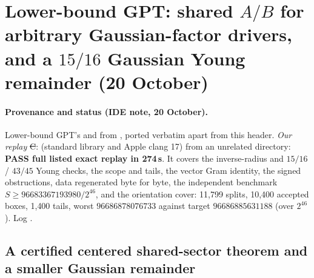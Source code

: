 \section{Lower-bound GPT: shared $A/B$ for arbitrary Gaussian-factor drivers, and a $15/16$ Gaussian Young remainder (20 October)}\label{ch:gaussian-remainder}

\paragraph{Provenance and status (IDE note, 20 October).} Lower-bound GPT's  and 
from , ported verbatim apart from this header. \emph{Our replay} \st{C}:  (standard library and Apple clang 17) from an
unrelated directory: \textbf{PASS full listed exact replay in 274\,s}. It covers the inverse-radius and $15/16$ / $43/45$ Young checks, the scope and tails, the vector Gram identity, the signed
obstructions, data regenerated byte for byte, the independent benchmark $S\ge96683367193980/2^{46}$, and the orientation cover: 11{,}799 splits, 10{,}400 accepted boxes, 1{,}400 tails, worst
$96686878076733$ against target $96686885631188$ (over $2^{46}$). Log .

\subsection{A certified centered shared-sector theorem and a smaller Gaussian remainder}
\label{sec:new-gaussian-remainder}

